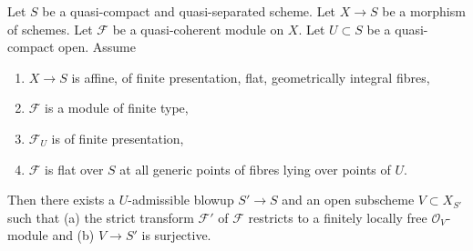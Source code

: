 \begin{lemma}
\label{lemma-flatten-module-pre}
Let $S$ be a quasi-compact and quasi-separated scheme.
Let $X \to S$ be a morphism of schemes.
Let $\mathcal{F}$ be a quasi-coherent module on $X$.
Let $U \subset S$ be a quasi-compact open. Assume
\begin{enumerate}
\item $X \to S$ is affine, of finite presentation, flat,
geometrically integral fibres,
\item $\mathcal{F}$ is a module of finite type,
\item $\mathcal{F}_U$ is of finite presentation,
\item $\mathcal{F}$ is flat over $S$ at all generic points of
fibres lying over points of $U$.
\end{enumerate}
Then there exists a $U$-admissible blowup $S' \to S$
and an open subscheme $V \subset X_{S'}$
such that (a) the strict transform $\mathcal{F}'$ of $\mathcal{F}$
restricts to a finitely locally free $\mathcal{O}_V$-module and
(b) $V \to S'$ is surjective.
\end{lemma}

